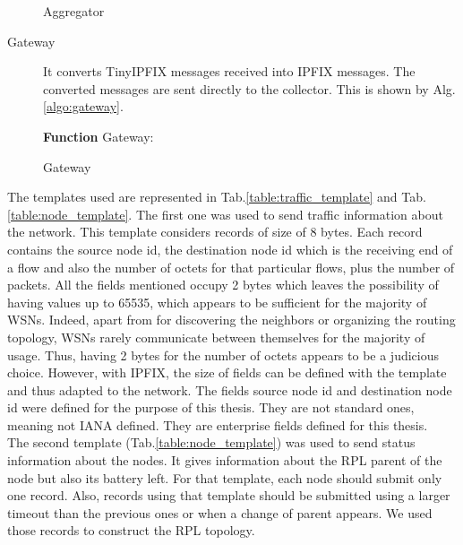 \begin{description}
\begin{algorithm}
{			
    }
   \caption{Aggregator}
   \label{algo:aggregator}
  \end{algorithm}

  \item[Gateway] It converts TinyIPFIX messages received into IPFIX messages. The converted messages are sent directly to the collector. This is shown by Alg.\ref{algo:gateway}.

  \begin{algorithm}
    \textbf{Function} Gateway:\\
   \caption{Gateway}
   \label{algo:gateway}
  \end{algorithm}

\end{description}

The templates used are represented in Tab.\ref{table:traffic_template} and Tab.\ref{table:node_template}. The first one was used to send traffic information about the network. This template considers records of size of 8 bytes. Each record contains the source node id, the destination node id which is the receiving end of a flow and also the number of octets for that particular flows, plus the number of packets. All the fields mentioned occupy 2 bytes which leaves the possibility of having values up to 65535, which appears to be sufficient for the majority of WSNs. Indeed, apart from for discovering the neighbors or organizing the routing topology, WSNs rarely communicate between themselves for the majority of usage. Thus, having 2 bytes for the number of octets appears to be a judicious choice. However, with IPFIX, the size of fields can be defined with the template and thus adapted to the network. The fields source node id and destination node id were defined for the purpose of this thesis. They are not standard ones, meaning not IANA defined. They are enterprise fields defined for this thesis. \\

The second template (Tab.\ref{table:node_template}) was used to send status information about the nodes. It gives information about the RPL parent of the node but also its battery left. For that template, each node should submit only one record. Also, records using that template should be submitted using a larger timeout than the previous ones or when a change of parent appears. We used those records to construct the RPL topology.

